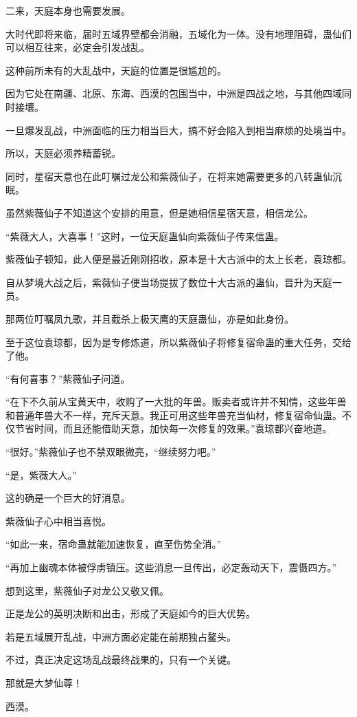 \begin{this_body}
二来，天庭本身也需要发展。

大时代即将来临，届时五域界壁都会消融，五域化为一体。没有地理阻碍，蛊仙们可以相互往来，必定会引发战乱。

这种前所未有的大乱战中，天庭的位置是很尴尬的。

因为它处在南疆、北原、东海、西漠的包围当中，中洲是四战之地，与其他四域同时接壤。

一旦爆发乱战，中洲面临的压力相当巨大，搞不好会陷入到相当麻烦的处境当中。

所以，天庭必须养精蓄锐。

同时，星宿天意也在此叮嘱过龙公和紫薇仙子，在将来她需要更多的八转蛊仙沉眠。

虽然紫薇仙子不知道这个安排的用意，但是她相信星宿天意，相信龙公。

“紫薇大人，大喜事！”这时，一位天庭蛊仙向紫薇仙子传来信蛊。

紫薇仙子顿知，此人便是最近刚刚招收，原本是十大古派中的太上长老，袁琼都。

自从梦境大战之后，紫薇仙子便当场提拔了数位十大古派的蛊仙，晋升为天庭一员。

那两位叮嘱凤九歌，并且截杀上极天鹰的天庭蛊仙，亦是如此身份。

至于这位袁琼都，因为是专修炼道，所以紫薇仙子将修复宿命蛊的重大任务，交给了他。

“有何喜事？”紫薇仙子问道。

“在下不久前从宝黄天中，收购了一大批的年兽。贩卖者或许并不知情，这些年兽和普通年兽大不一样，充斥天意。我正可用这些年兽充当仙材，修复宿命仙蛊。不仅节省时间，而且还能借助天意，加快每一次修复的效果。”袁琼都兴奋地道。

“很好。”紫薇仙子也不禁双眼微亮，“继续努力吧。”

“是，紫薇大人。”

这的确是一个巨大的好消息。

紫薇仙子心中相当喜悦。

“如此一来，宿命蛊就能加速恢复，直至伤势全消。”

“再加上幽魂本体被俘虏镇压。这些消息一旦传出，必定轰动天下，震慑四方。”

想到这里，紫薇仙子对龙公又敬又佩。

正是龙公的英明决断和出击，形成了天庭如今的巨大优势。

若是五域展开乱战，中洲方面必定能在前期独占鳌头。

不过，真正决定这场乱战最终战果的，只有一个关键。

那就是大梦仙尊！

西漠。


\end{this_body}
